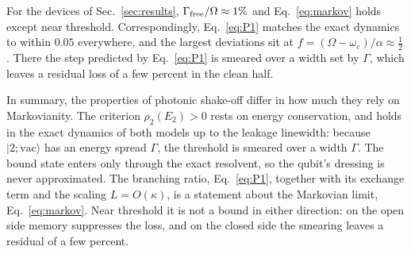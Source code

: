 \documentclass[aps,prresearch,twocolumn,superscriptaddress,nofootinbib,longbibliography,floatfix]{revtex4-2}
\begin{document}
For the devices of Sec.~\ref{sec:results}, $\Gamma_{\rm free}/\Omega\approx1\%$ and
Eq.~\eqref{eq:markov} holds except near threshold. Correspondingly, Eq.~\eqref{eq:P1} matches the exact dynamics to
within $0.05$ everywhere, and the largest deviations sit at $f=(\Omega-\omega_e)/\alpha\approx\tfrac12$. There the step
predicted by Eq.~\eqref{eq:P1} is smeared over a width set by $\Gamma$, which leaves a residual loss of a few percent in
the clean half.

In summary, the properties of photonic shake-off differ in how much they rely on Markovianity. The criterion
$\rho_2(E_2)>0$ rests on energy conservation, and holds in the exact dynamics of both models up to the leakage
linewidth: because $|2;\mathrm{vac}\rangle$ has an energy spread $\Gamma$, the threshold is smeared over a width
$\Gamma$. The bound state enters only through the exact resolvent, so the qubit's dressing is never approximated. The
branching ratio, Eq.~\eqref{eq:P1}, together with its exchange term and the scaling $L=O(\kappa)$, is a statement about
the Markovian limit, Eq.~\eqref{eq:markov}. Near threshold it is not a bound in either direction: on the open side
memory suppresses the loss, and on the closed side the smearing leaves a residual of a few percent.
\end{document}

